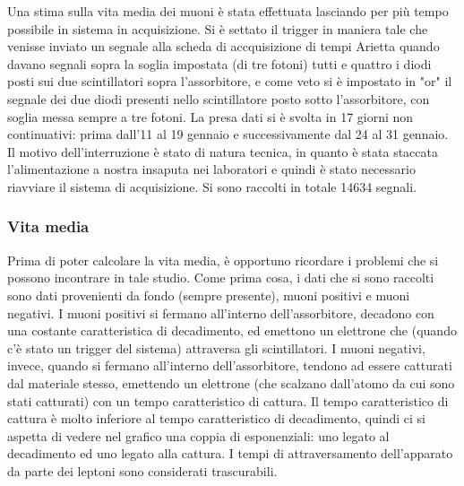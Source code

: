 Una stima sulla vita media dei muoni è stata effettuata lasciando per più tempo possibile in sistema in acquisizione. Si è settato il trigger in maniera tale che venisse inviato un segnale alla scheda di accquisizione di tempi Arietta quando davano segnali sopra la soglia  impostata (di tre fotoni) tutti e quattro i diodi posti sui due scintillatori sopra l'assorbitore, e come veto si è impostato in "or" il segnale dei due diodi presenti nello scintillatore posto sotto l'assorbitore, con soglia messa sempre a tre fotoni. La presa dati si è svolta in 17 giorni non continuativi: prima dall'11 al 19 gennaio e successivamente dal 24 al 31 gennaio. Il motivo dell'interruzione è stato di natura tecnica, in quanto è stata staccata l'alimentazione a nostra insaputa nei laboratori e quindi è stato necessario riavviare il sistema di acquisizione. Si sono raccolti in totale 14634 segnali.

\subsubsection{Vita media}
Prima di poter calcolare la vita  media, è opportuno ricordare i problemi che si possono incontrare in tale studio. Come prima cosa, i dati che si sono raccolti sono dati provenienti da fondo (sempre presente),  muoni positivi e muoni negativi. I muoni positivi si fermano all'interno dell'assorbitore, decadono con una costante caratteristica di decadimento, ed emettono un elettrone che (quando c'è stato un  trigger del sistema) attraversa gli scintillatori. I muoni negativi, invece, quando si fermano all'interno dell'assorbitore, tendono ad essere catturati dal materiale stesso, emettendo un elettrone (che scalzano dall'atomo da cui sono stati catturati) con un tempo caratteristico di cattura. Il tempo caratteristico di cattura è molto inferiore al tempo caratteristico di decadimento, quindi ci si aspetta di vedere nel grafico una coppia di esponenziali: uno legato al decadimento ed uno legato alla cattura. I tempi di attraversamento dell'apparato da parte dei leptoni sono considerati trascurabili.\\

